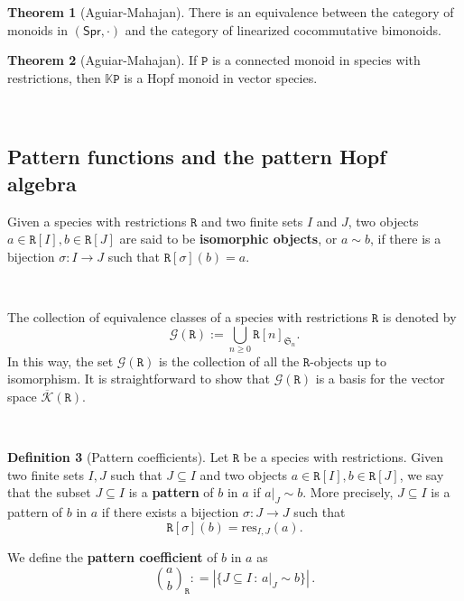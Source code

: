 \documentclass[12pt, reqno]{amsart}
\theoremstyle{definition}
\newtheorem{thm}{Theorem}[section]
\newtheorem{defin}[thm]{Definition}
\newcommand{\Spr}{\mathsf{Spr}} %
\newcommand{\prP}{\mathtt{P}}
\newcommand{\prR}{\mathtt{R}}
\newcommand{\Kc}{\mathcal{K}}
\newcommand{\Kcb}{\overline{\Kc}}
\begin{document}
\begin{thm}[Aguiar-Mahajan]\label{MonRestr1}
There is an equivalence between the category of monoids in $(\Spr, \cdot)$ and the category of linearized cocommutative bimonoids.
\end{thm}


\begin{thm}[Aguiar-Mahajan]\label{MonRestr2}
If $\prP$ is a connected monoid in species with restrictions, then $\mathbb{K}\prP$ is a Hopf monoid in vector species.
\end{thm}

\

\subsection{Pattern functions and the pattern Hopf algebra}


Given a species with restrictions $\prR$ and two finite sets $I$ and $J$, two objects $a\in \prR[I], b\in \prR[J]$ are said to be {\bf isomorphic objects}, or $a\sim b$, if there is a bijection $\sigma:I\to J$ such that $\prR[\sigma](b)=a$. 

\

The collection of equivalence classes of a species with restrictions $\prR$ is denoted by \begin{equation}
\mathcal{G}(\prR) := \bigcup_{n\geq 0 } \prR[n]_{\mathfrak{S}_n}.
\end{equation}
In this way, the set $\mathcal G(\prR) $ is the collection of all the $\prR$-objects up to isomorphism. It is straightforward to show that $\mathcal{G}(\prR)$ is a basis for the vector space $\Kcb(\prR)$.

\


\begin{defin}[Pattern coefficients]\label{defin:patterncoeff}
Let $\prR$ be a species with restrictions. Given two finite sets $I,J$ such that $J \subseteq I$ and two objects $a\in \prR[I], b\in \prR[J]$,
we say that the subset $J \subseteq I$ is a {\bf pattern} of $b$ in $a$ if $a|_{J} \sim b$. More precisely, $J \subseteq I$ is a pattern of $b$ in $a$ if there exists a bijection $\sigma: J \to J$ such that
\[\prR[\sigma](b)=\text{res}_{I,J}(a).\]

We define the {\bf pattern coefficient} of $b$ in $a$ as
\begin{equation}
    \binom{a}{b}_{\!\prR} : = \left| \{J \subseteq I \, : \, a|_J \sim b \} \right| \, .
\end{equation}
\end{defin}
\end{document}
